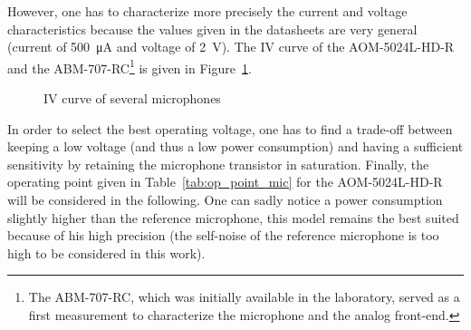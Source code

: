 \documentclass{EPL-master-thesis-covers-EN}
\begin{document}
\begin{table}[H]
\centering
{}
\caption{Comparison of several electret condenser microphones}
\label{tab:mic_comparison}
\end{table}

However, one has to characterize more precisely the current and voltage characteristics because the values given in the datasheets are very general (current of \SI{500}{\micro A} and voltage of \SI{2}{V}). The IV curve of the AOM-5024L-HD-R and the ABM-707-RC\footnote{The ABM-707-RC, which was initially available in the laboratory, served as a first measurement to characterize the microphone and the analog front-end.} is given in Figure~\ref{fig:IV_mic}.

\begin{figure}[H]
    \centering
    
    \caption{IV curve of several microphones}
    \label{fig:IV_mic}
\end{figure}



In order to select the best operating voltage, one has to find a trade-off between keeping a low voltage (and thus a low power consumption) and having a sufficient sensitivity by retaining the microphone transistor in saturation. Finally, the operating point given in Table~\ref{tab:op_point_mic} for the AOM-5024L-HD-R will be considered in the following. One can sadly notice a power consumption slightly higher than the reference microphone, this model remains the best suited because of his high precision (the self-noise of the reference microphone is too high to be considered in this work).
\end{document}
